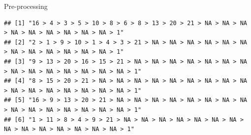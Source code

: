 \documentclass[
]{book}
\newenvironment{Shaded}{\begin{snugshade}}{\end{snugshade}}
\newcommand{\AttributeTok}[1]{\textcolor[rgb]{0.77,0.63,0.00}{#1}}
\newcommand{\ControlFlowTok}[1]{\textcolor[rgb]{0.13,0.29,0.53}{\textbf{#1}}}
\newcommand{\DecValTok}[1]{\textcolor[rgb]{0.00,0.00,0.81}{#1}}
\newcommand{\FunctionTok}[1]{\textcolor[rgb]{0.00,0.00,0.00}{#1}}
\newcommand{\NormalTok}[1]{#1}
\newcommand{\OtherTok}[1]{\textcolor[rgb]{0.56,0.35,0.01}{#1}}
\newcommand{\SpecialCharTok}[1]{\textcolor[rgb]{0.00,0.00,0.00}{#1}}
\newcommand{\StringTok}[1]{\textcolor[rgb]{0.31,0.60,0.02}{#1}}
\begin{document}
Pre-processing

\begin{Shaded}
\end{Shaded}

\begin{verbatim}
## [1] "16 > 4 > 3 > 5 > 10 > 8 > 6 > 8 > 13 > 20 > 21 > NA > NA > NA > NA > NA > NA > NA > NA > NA > 1"     
## [2] "2 > 1 > 9 > 10 > 1 > 4 > 3 > 21 > NA > NA > NA > NA > NA > NA > NA > NA > NA > NA > NA > NA > 1"     
## [3] "9 > 13 > 20 > 16 > 15 > 21 > NA > NA > NA > NA > NA > NA > NA > NA > NA > NA > NA > NA > NA > NA > 1"
## [4] "8 > 15 > 20 > 21 > NA > NA > NA > NA > NA > NA > NA > NA > NA > NA > NA > NA > NA > NA > NA > NA > 1"
## [5] "16 > 9 > 13 > 20 > 21 > NA > NA > NA > NA > NA > NA > NA > NA > NA > NA > NA > NA > NA > NA > NA > 1"
## [6] "1 > 11 > 8 > 4 > 9 > 21 > NA > NA > NA > NA > NA > NA > NA > NA > NA > NA > NA > NA > NA > NA > 1"
\end{verbatim}

\begin{Shaded}
\end{Shaded}
\end{document}
